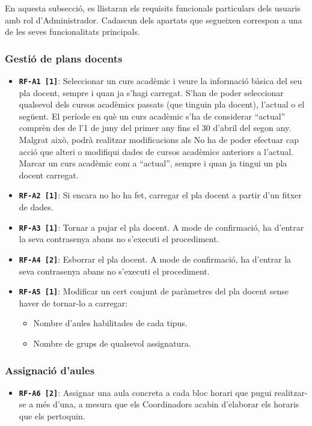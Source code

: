 \documentclass[a4paper,12pt]{ThesisStyle}
\begin{document}
En aquesta subsecció, es llistaran els requisits funcionals particulars dels usuaris amb rol d'Administrador. Cadascun dels apartats que segueixen correspon a una de les seves funcionalitats principals.

\subsubsection{Gestió de plans docents}
\begin{itemize}
  \item \texttt{\textbf{RF-A1 [1]}}: Seleccionar un curs acadèmic i veure la informació bàsica del seu pla docent, sempre i quan ja s'hagi carregat. S'han de poder seleccionar qualsevol dels cursos acadèmics passats (que tinguin pla docent), l'actual o el següent. El període en què un curs acadèmic s'ha de considerar ``actual'' comprèn des de l'1 de juny del primer any fins el 30 d'abril del segon any. Malgrat això, podrà realitzar modificacions als No ha de poder efectuar cap acció que alteri o modifiqui dades de cursos acadèmics anteriors a l'actual. Marcar un curs acadèmic com a ``actual'', sempre i quan ja tingui un pla docent carregat.
  \item \texttt{\textbf{RF-A2 [1]}}: Si encara no ho ha fet, carregar el pla docent a partir d'un fitxer de dades.
  \item \texttt{\textbf{RF-A3 [1]}}: Tornar a pujar el pla docent. A mode de confirmació, ha d'entrar la seva contrasenya abans no s'executi el procediment.
  \item \texttt{\textbf{RF-A4 [2]}}: Esborrar el pla docent. A mode de confirmació, ha d'entrar la seva contrasenya abans no s'executi el procediment.
  \item \texttt{\textbf{RF-A5 [1]}}: Modificar un cert conjunt de paràmetres del pla docent sense haver de tornar-lo a carregar:
        \begin{itemize}
          \item Nombre d'aules habilitades de cada tipus.
          \item Nombre de grups de qualsevol assignatura.
        \end{itemize}
\end{itemize}

\subsubsection{Assignació d'aules}
\begin{itemize}
  \item \texttt{\textbf{RF-A6 [2]}}: Assignar una aula concreta a cada bloc horari que pugui realitzar-se a més d'una, a mesura que els Coordinadors acabin d'elaborar els horaris que els pertoquin.
\end{itemize}
\end{document}
